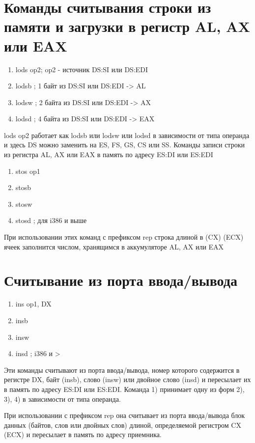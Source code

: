 \section{Команды считывания строки из памяти и загрузки в регистр AL, AX или EAX}

\begin{enumerate}
    \item lods op2; op2 - источник DS:SI или DS:EDI
    \item lodsb ; 1 байт из DS:SI или DS:EDI -> AL
    \item lodsw ; 2 байта из DS:SI или DS:EDI -> AX
    \item lodsd ; 4 байта из DS:SI или DS:EDI -> EAX
\end{enumerate}
lods op2 работает как lodsb или lodsw или lodsd в зависимости от типа операнда и здесь DS можно заменить на ES, FS, GS, CS или SS.
Команды записи строки из регистра AL, AX или EAX в память по адресу ES:DI или ES:EDI
\begin{enumerate}
    \item stos op1
    \item stosb
    \item stosw
    \item stosd ; для i386 и выше
\end{enumerate}
При использовании этих команд с префиксом rep строка длиной в (CX) (ECX) ячеек заполнится числом, хранящимся в аккумуляторе AL, AX или EAX

\section{Считывание из порта ввода/вывода}
\begin{enumerate}
    \item ins op1, DX
    \item insb
    \item insw
    \item insd ; i386 и > 
\end{enumerate}

Эти команды считывают из порта ввода/вывода, номер которого содержится в регистре DX, байт (insb), слово (insw) или двойное слово (insd) и пересылает их в память по адресу ES:DI или ES:EDI.
Команда 1) принимает одну из форм 2), 3), 4) в зависимости от типа операнда.

При использовании с префиксом rep она считывает из порта ввода/вывода блок данных (байтов, слов или двойных слов) длиной, определяемой регистром CX (ECX) и пересылает в память по адресу приемника.

